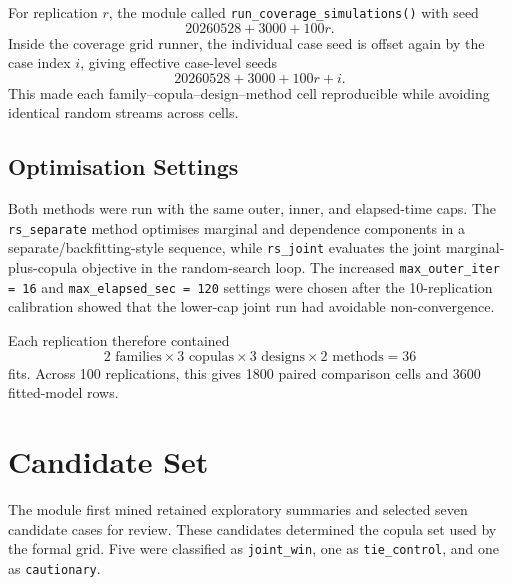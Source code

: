 \documentclass[11pt]{article}
\begin{document}
For replication \(r\), the module called
\texttt{run\_coverage\_simulations()} with seed
\[
20260528 + 3000 + 100r.
\]
Inside the coverage grid runner, the individual case seed is offset again by
the case index \(i\), giving effective case-level seeds
\[
20260528 + 3000 + 100r + i.
\]
This made each family--copula--design--method cell reproducible while avoiding
identical random streams across cells.

\subsection{Optimisation Settings}

Both methods were run with the same outer, inner, and elapsed-time caps.  The
\texttt{rs\_separate} method optimises marginal and dependence components in a
separate/backfitting-style sequence, while \texttt{rs\_joint} evaluates the
joint marginal-plus-copula objective in the random-search loop.  The increased
\texttt{max\_outer\_iter = 16} and \texttt{max\_elapsed\_sec = 120} settings
were chosen after the 10-replication calibration showed that the lower-cap
joint run had avoidable non-convergence.

Each replication therefore contained
\[
2 \text{ families} \times 3 \text{ copulas} \times 3 \text{ designs}
\times 2 \text{ methods} = 36
\]
fits.  Across 100 replications, this gives 1800 paired comparison cells and
3600 fitted-model rows.

\section{Candidate Set}

The module first mined retained exploratory summaries and selected seven
candidate cases for review.  These candidates determined the copula set used by
the formal grid.  Five were classified as \texttt{joint\_win}, one as
\texttt{tie\_control}, and one as \texttt{cautionary}.
\end{document}

